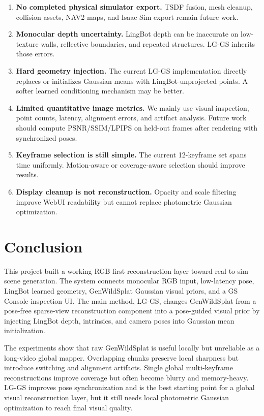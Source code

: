 \documentclass[11pt]{article}
\newcommand{\methodabbr}{LG-GS}
\newcommand{\RouteB}{\methodabbr\xspace}
\begin{document}
\begin{enumerate}
    \item \textbf{No completed physical simulator export.} TSDF fusion, mesh cleanup, collision assets, NAV2 maps, and Isaac Sim export remain future work.
    \item \textbf{Monocular depth uncertainty.} LingBot depth can be inaccurate on low-texture walls, reflective boundaries, and repeated structures. \RouteB inherits those errors.
    \item \textbf{Hard geometry injection.} The current \RouteB implementation directly replaces or initializes Gaussian means with LingBot-unprojected points. A softer learned conditioning mechanism may be better.
    \item \textbf{Limited quantitative image metrics.} We mainly use visual inspection, point counts, latency, alignment errors, and artifact analysis. Future work should compute PSNR/SSIM/LPIPS on held-out frames after rendering with synchronized poses.
    \item \textbf{Keyframe selection is still simple.} The current 12-keyframe set spans time uniformly. Motion-aware or coverage-aware selection should improve results.
    \item \textbf{Display cleanup is not reconstruction.} Opacity and scale filtering improve WebUI readability but cannot replace photometric Gaussian optimization.
\end{enumerate}

\section{Conclusion}

This project built a working RGB-first reconstruction layer toward real-to-sim scene generation. The system connects monocular RGB input, low-latency pose, LingBot learned geometry, GenWildSplat Gaussian visual priors, and a GS Console inspection UI. The main method, \RouteB, changes GenWildSplat from a pose-free sparse-view reconstruction component into a pose-guided visual prior by injecting LingBot depth, intrinsics, and camera poses into Gaussian mean initialization.

The experiments show that raw GenWildSplat is useful locally but unreliable as a long-video global mapper. Overlapping chunks preserve local sharpness but introduce switching and alignment artifacts. Single global multi-keyframe reconstructions improve coverage but often become blurry and memory-heavy. \RouteB improves pose synchronization and is the best starting point for a global visual reconstruction layer, but it still needs local photometric Gaussian optimization to reach final visual quality.
\end{document}

